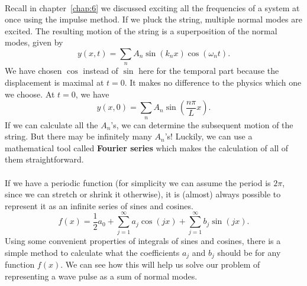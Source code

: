\documentclass[../classical_mechanics.tex]{subfiles}
\begin{document}
        \paragraph{}
        Recall in chapter~\ref{chap:6} we discussed exciting all the frequencies of a system at once using the impulse method.
        If we pluck the string, multiple normal modes are excited.
        The resulting motion of the string is a superposition of the normal modes, given by
        \begin{equation}
            y(x,t)=\sum_n A_n\sin(k_n x)\cos(\omega_n t).
        \end{equation}
        We have chosen $\cos$ instead of $\sin$ here for the temporal part because the displacement is maximal at $t=0$.
        It makes no difference to the physics which one we choose.
        At $t=0$, we have
        \begin{equation}\label{eq:waves:plucked-string-initial-conditions}
            y(x,0)=\sum_n A_n\sin\left(\frac{n\pi}{L}x\right).
        \end{equation}
        If we can calculate all the $A_n$'s, we can determine the subsequent motion of the string.
        But there may be infinitely many $A_n$'s!
        Luckily, we can use a mathematical tool called \textbf{Fourier series} which makes the calculation of all of them straightforward.

        \paragraph{}
        If we have a periodic function (for simplicity we can assume the period is $2\pi$, since we can stretch or shrink it otherwise), it is (almost) always possible to represent it as an infinite series of sines and cosines.
        \begin{equation}\label{eq:waves:fourier-series}
            f(x)=\frac{1}{2}a_0+\sum_{j=1}^\infty a_j\cos(jx)+\sum_{j=1}^\infty b_j\sin(jx).
        \end{equation}
        Using some convenient properties of integrals of sines and cosines, there is a simple method to calculate what the coefficients $a_j$ and $b_j$ should be for any function $f(x)$.
        We can see how this will help us solve our problem of representing a wave pulse as a sum of normal modes.
\end{document}
